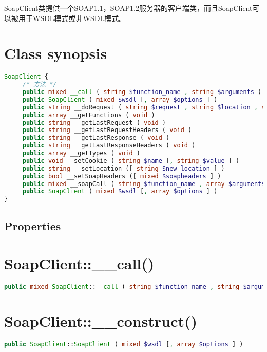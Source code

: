 SoapClient类提供一个SOAP1.1，SOAP1.2服务器的客户端类，而且SoapClient可以被用于WSDL模式或非WSDL模式。

\section{Class synopsis}


\begin{lstlisting}[language=PHP]
SoapClient {
     /* 方法 */
     public mixed __call ( string $function_name , string $arguments )
     public SoapClient ( mixed $wsdl [, array $options ] )
     public string __doRequest ( string $request , string $location , string $action , int $version [, int $one_way = 0 ] )
     public array __getFunctions ( void )
     public string __getLastRequest ( void )
     public string __getLastRequestHeaders ( void )
     public string __getLastResponse ( void )
     public string __getLastResponseHeaders ( void )
     public array __getTypes ( void )
     public void __setCookie ( string $name [, string $value ] )
     public string __setLocation ([ string $new_location ] )
     public bool __setSoapHeaders ([ mixed $soapheaders ] )
     public mixed __soapCall ( string $function_name , array $arguments [, array $options [, mixed $input_headers [, array &$output_headers ]]] )
     public SoapClient ( mixed $wsdl [, array $options ] )
}
\end{lstlisting}

\subsection{Properties}



\section{SoapClient::\_\_call()}


\begin{lstlisting}[language=PHP]
public mixed SoapClient::__call ( string $function_name , string $arguments )
\end{lstlisting}

\section{SoapClient::\_\_construct()}

\begin{lstlisting}[language=PHP]
public SoapClient::SoapClient ( mixed $wsdl [, array $options ] )
\end{lstlisting}

